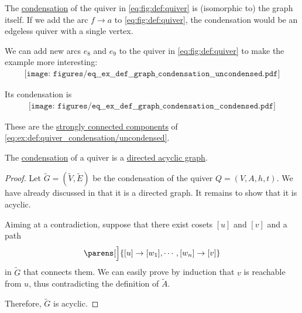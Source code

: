 \begin{example}\label{ex:def:quiver_condensation}
  The \hyperref[def:quiver_condensation]{condensation} of the quiver in \eqref{eq:fig:def:quiver} is (isomorphic to) the graph itself. If we add the arc \( f \to a \) to \eqref{eq:fig:def:quiver}, the condensation would be an edgeless quiver with a single vertex.

  We can add new arcs \( e_8 \) and \( e_9 \) to the quiver in \eqref{eq:fig:def:quiver} to make the example more interesting:
  \begin{equation}\label{eq:ex:def:quiver_condensation/uncondensed}
    \begin{aligned}
      \texttt{[image: figures/eq\_\_ex\_\_def\_\_graph\_condensation\_\_uncondensed.pdf]}
    \end{aligned}
  \end{equation}

  Its condensation is
  \begin{equation}\label{eq:ex:def:quiver_condensation/condensed}
    \begin{aligned}
      \texttt{[image: figures/eq\_\_ex\_\_def\_\_graph\_condensation\_\_condensed.pdf]}
    \end{aligned}
  \end{equation}

  These are the \hyperref[def:quiver_connectedness/strong]{strongly connected components} of \eqref{eq:ex:def:quiver_condensation/uncondensed}.
\end{example}

\begin{proposition}\label{thm:graph_condensation_is_acyclic_dag}
  The \hyperref[def:quiver_condensation]{condensation} of a quiver is a \hyperref[def:undirected_multigraph_path]{directed acyclic graph}.
\end{proposition}
\begin{proof}
  Let \( \widetilde{G} = (\widetilde{V}, \widetilde{E}) \) be the condensation of the quiver \( Q = (V, A, h, t) \). We have already discussed in  that it is a directed graph. It remains to show that it is acyclic.

  Aiming at a contradiction, suppose that there exist cosets \( [u] \) and \( [v] \) and a path
  \begin{equation*}
    \parens[\Big]{ [u] \to [w_1], \cdots, [w_n] \to [v] }
  \end{equation*}
  in \( \widetilde{G} \) that connects them. We can easily prove by induction that \( v \) is reachable from \( u \), thus contradicting the definition of \( \widetilde{A} \).

  Therefore, \( \widetilde{G} \) is acyclic.
\end{proof}

